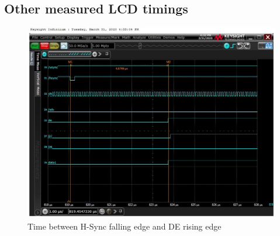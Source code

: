 \subsection{Other measured LCD timings}%
\label{sub:Other measured LCD timings}

\begin{figure}[ht]
\begin{center}
    \includegraphics[width=13cm]{pictures/lcd_timings/hsync_falling_de_rising.jpg}
\end{center}
\caption{Time between H-Sync falling edge and DE rising edge}
\label{fig:hsync_de}
\end{figure}
